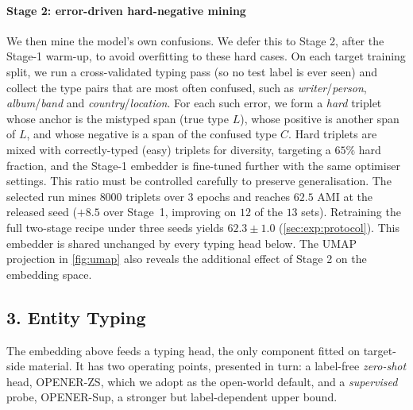 \paragraph{Stage 2: error-driven hard-negative mining}
We then mine the model's own confusions. We defer this to Stage 2, after the Stage-1 warm-up, to avoid overfitting to these hard cases.
On each target training split, we run a cross-validated typing pass (so no test label is ever seen) and collect the type pairs that are most often confused, such as \emph{writer}/\emph{person}, \emph{album}/\emph{band} and \emph{country}/\emph{location}.
For each such error, we form a \emph{hard} triplet whose anchor is the mistyped span (true type $L$), whose positive is another span of $L$, and whose negative is a span of the confused type $C$.
Hard triplets are mixed with correctly-typed (easy) triplets for diversity, targeting a $65\%$ hard fraction, and the Stage-1 embedder is fine-tuned further with the same optimiser settings. This ratio must be controlled carefully to preserve generalisation.
The selected run mines $8000$ triplets over $3$ epochs and reaches $62.5$ AMI at the released seed ($+8.5$ over Stage~1, improving on $12$ of the $13$ sets). Retraining the full two-stage recipe under three seeds yields $62.3 \pm 1.0$ (\autoref{sec:exp:protocol}).
This embedder is shared unchanged by every typing head below. The UMAP projection in \autoref{fig:umap} also reveals the additional effect of Stage 2 on the embedding space.

\subsection*{3. Entity Typing}
\label{sec:method:typing}
\setcounter{paragraph}{0}

The embedding above feeds a typing head, the only component fitted on target-side material. It has two operating points, presented in turn: a label-free \emph{zero-shot} head, OPENER-ZS, which we adopt as the open-world default, and a \emph{supervised} probe, OPENER-Sup, a stronger but label-dependent upper bound.


